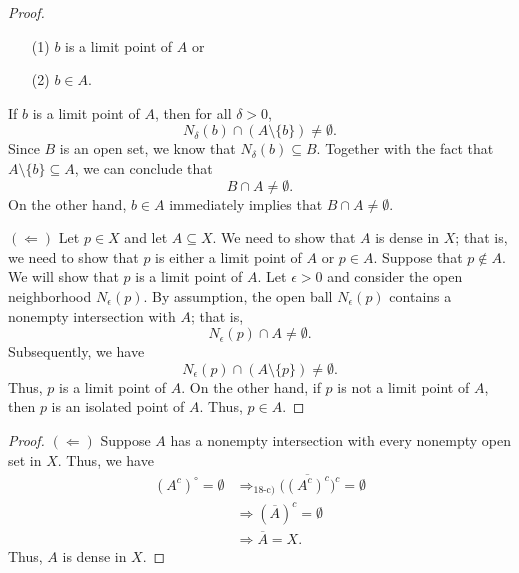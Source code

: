 \documentclass[a4paper]{article}
\begin{document}
\begin{enumerate}
\begin{proof}
            \begin{enumerate}
                \item[(1)] \( b   \) is a limit point of \( A  \) or
                \item[(2)] \( b \in A  \).
            \end{enumerate}
            If \( b  \) is a limit point of \( A  \), then for all \( \delta > 0  \), 
            \[  {N}_{\delta}(b) \cap (A \setminus  \{ b \} ) \neq \emptyset.  \]
            Since \( B \) is an open set, we know that \( {N}_{\delta}(b) \subseteq B \). Together with the fact that \( A \setminus  \{ b \} \subseteq  A  \), we can conclude that 
            \[  B \cap A \neq \emptyset. \]
            On the other hand, \( b \in A  \) immediately implies that \( B \cap A \neq \emptyset \).

            \( (\Longleftarrow) \) Let \( p \in X  \) and let \( A \subseteq X  \). We need to show that \( A  \) is dense in \( X  \); that is, we need to show that \( p  \) is either a limit point of \( A  \) or \( p \in A  \). Suppose that \( p \notin A  \). We will show that \( p  \) is a limit point of \( A  \). Let \( \epsilon > 0 \) and consider the open neighborhood \( {N}_{\epsilon}(p) \). By assumption, the open ball \( {N}_{\epsilon}(p) \) contains a nonempty intersection with \( A  \); that is,  
            \[  {N}_{\epsilon}(p) \cap A \neq \emptyset. \]
            Subsequently, we have
            \[  {N}_{\epsilon}(p) \cap (A \setminus  \{ p\} ) \neq \emptyset.  \]
            Thus, \( p  \) is a limit point of \( A  \). On the other hand, if \( p  \) is not a limit point of \( A  \), then \( p \) is an isolated point of \( A  \). Thus, \( p \in A  \). 
        \end{proof}
        \begin{proof}
        \( (\Longleftarrow) \) Suppose \( A  \) has a nonempty intersection with every nonempty open set in \( X  \). Thus, we have     
        \begin{align*}
            (A^{c})^{\circ} = \emptyset &\Longrightarrow_{\text{18-c)}} \Big(  \overline{(A^{c})^{c}} \Big)^{c} = \emptyset \\
                                        &\Longrightarrow  (\overline{A})^{c} = \emptyset \\
                                        &\Longrightarrow \overline{A} = X.
        \end{align*}
        Thus, \( A  \) is dense in \( X  \).


\end{proof}
\end{enumerate}
\end{document}
